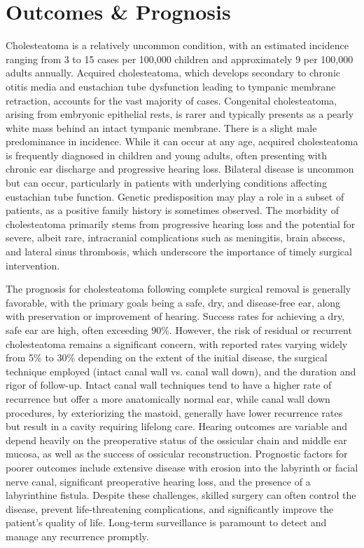 \section*{Outcomes \& Prognosis}
Cholesteatoma is a relatively uncommon condition, with an estimated incidence ranging from 3 to 15 cases per 100,000 children and approximately 9 per 100,000 adults annually. Acquired cholesteatoma, which develops secondary to chronic otitis media and eustachian tube dysfunction leading to tympanic membrane retraction, accounts for the vast majority of cases. Congenital cholesteatoma, arising from embryonic epithelial rests, is rarer and typically presents as a pearly white mass behind an intact tympanic membrane. There is a slight male predominance in incidence. While it can occur at any age, acquired cholesteatoma is frequently diagnosed in children and young adults, often presenting with chronic ear discharge and progressive hearing loss. Bilateral disease is uncommon but can occur, particularly in patients with underlying conditions affecting eustachian tube function. Genetic predisposition may play a role in a subset of patients, as a positive family history is sometimes observed. The morbidity of cholesteatoma primarily stems from progressive hearing loss and the potential for severe, albeit rare, intracranial complications such as meningitis, brain abscess, and lateral sinus thrombosis, which underscore the importance of timely surgical intervention.

The prognosis for cholesteatoma following complete surgical removal is generally favorable, with the primary goals being a safe, dry, and disease-free ear, along with preservation or improvement of hearing. Success rates for achieving a dry, safe ear are high, often exceeding 90\%. However, the risk of residual or recurrent cholesteatoma remains a significant concern, with reported rates varying widely from 5\% to 30\% depending on the extent of the initial disease, the surgical technique employed (intact canal wall vs. canal wall down), and the duration and rigor of follow-up. Intact canal wall techniques tend to have a higher rate of recurrence but offer a more anatomically normal ear, while canal wall down procedures, by exteriorizing the mastoid, generally have lower recurrence rates but result in a cavity requiring lifelong care. Hearing outcomes are variable and depend heavily on the preoperative status of the ossicular chain and middle ear mucosa, as well as the success of ossicular reconstruction. Prognostic factors for poorer outcomes include extensive disease with erosion into the labyrinth or facial nerve canal, significant preoperative hearing loss, and the presence of a labyrinthine fistula. Despite these challenges, skilled surgery can often control the disease, prevent life-threatening complications, and significantly improve the patient's quality of life. Long-term surveillance is paramount to detect and manage any recurrence promptly.

